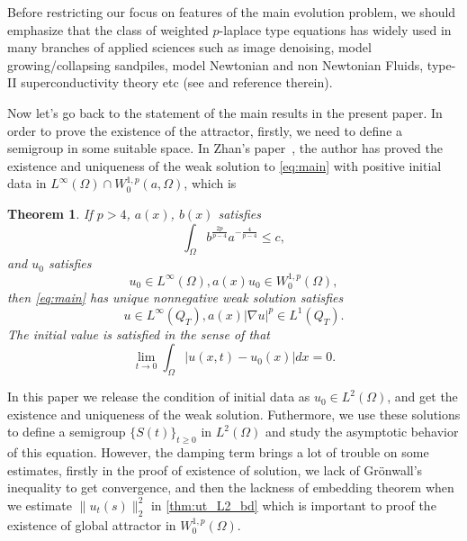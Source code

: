 \documentclass[11pt]{amsart}
\newtheorem{theorem}{Theorem}[section]
\theoremstyle{definition}
\numberwithin{equation}{section}
\newcommand*\abs[1]{\lvert#1\rvert}
\newcommand*\norm[1]{\lVert#1\rVert}
\newcommand*\Brace[1]{\lbrace#1\rbrace}
\begin{document}
Before restricting our focus on features of the main evolution problem,
we should emphasize that the class of weighted $p$-laplace type equations
has widely used in many branches of applied sciences such as image
denoising, model growing/collapsing sandpiles, model Newtonian and non Newtonian Fluids, type-II superconductivity theory etc (see \autocite{aronssonFastSlowDiffusion1996,aubertMathematicalProblemsImage2006,mastorakisSolutionPLaplacianNonNewtonian2009,yinLaplacianTypeEvolution2001} and reference therein).

Now let's go back to the statement of the main results in the present paper. In order to prove the existence of the attractor, firstly, we need to define a semigroup in some suitable space. In Zhan's paper~\cite{Zhan2019Uniquenessa}, the author has proved the existence and uniqueness of the weak solution to \cref{eq:main} with positive initial data in $L^{\infty}(\Omega) \cap W_0^{1,p}(a,\Omega)$, which is
\begin{theorem}\cite{Zhan2019Uniquenessa}\label{thm:zhan}
	If $p>4$, $a(x)$, $b(x)$ satisfies
	\begin{equation}
		\int_{\Omega} b^{\frac{2p}{p-4}}a^{-\frac{4}{p-4}} \leq c,
	\end{equation}
	and $u_0$ satisfies
	\begin{equation}
		u_0 \in L^{\infty}(\Omega), a(x)u_0 \in W_0^{1,p}(\Omega),
	\end{equation}
	then \cref{eq:main} has unique nonnegative weak solution satisfies
	\begin{equation}
		u \in L^{\infty}(Q_T), a(x)\abs{\nabla u}^p \in L^1(Q_T).
	\end{equation}
	The initial value is satisfied in the sense of that
	\begin{equation}
		\lim_{t \to 0}\int_{\Omega}\abs{u(x,t) - u_0(x)}dx = 0.
	\end{equation}
\end{theorem}
In this paper we release the condition of initial data as
$u_0 \in L^2(\Omega)$, and get the existence and
uniqueness of the weak solution. Futhermore, we use
these solutions to define a semigroup $\Brace{S(t)}_{t \geq 0} $ in $L^2(\Omega) $ and study the asymptotic behavior of this equation. However,
the damping term brings a lot of trouble on some estimates, firstly in
the proof of existence of solution, we lack of Gr\"onwall's inequality
to get convergence, and then the lackness of embedding theorem when we
estimate $\norm{u_t(s)}_2^2$ in \cref{thm:ut_L2_bd} which is important
to proof the existence of global attractor in $W_0^{1,p}(\Omega)$.
\end{document}
